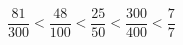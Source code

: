 %
%
  \begin{center}
    $\dfrac{81}{300}<
    \dfrac{48}{100}<
    \dfrac{25}{50}<
    \dfrac{300}{400}<
    \dfrac{7}{7}$
  \end{center}
